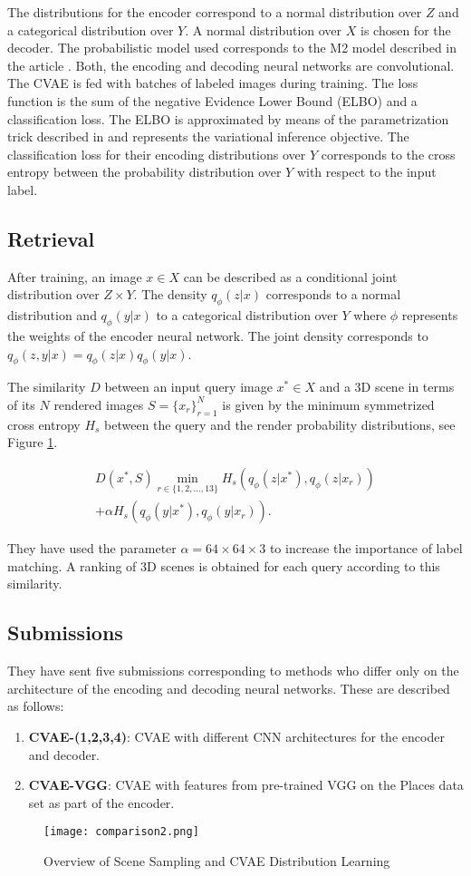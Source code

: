 \documentclass[../main.tex]{subfiles}
\begin{document}
The distributions for the encoder correspond to a normal distribution over $Z$ and a categorical distribution over $Y$. A normal distribution over $X$ is chosen for the decoder. The probabilistic model used corresponds to the M2 model described in the article \cite{Kingma2014a}. Both, the encoding and decoding neural networks are convolutional.\\

The CVAE is fed with batches of labeled images during training. The loss function is the sum of the negative Evidence Lower Bound (ELBO) and a classification loss. The ELBO is approximated by means of the parametrization trick described in \cite{Kingma2014a, kingma2013auto} and represents the variational inference objective. The classification loss for their encoding distributions over $Y$ corresponds to the cross entropy between the probability distribution over $Y$ with respect to the input label. 

\subsection{Retrieval}
After training, an image $x\in X$ can be described as a conditional joint distribution over $Z\times Y$. The density $q_\phi(z|x)$ corresponds to a normal distribution and $q_\phi(y|x)$ to a categorical distribution over $Y$ where $\phi$ represents the weights of the encoder neural network. The joint density corresponds to $q_\phi(z,y|x) = q_\phi(z|x) q_\phi(y|x)$.

The similarity $D$ between an input query image $x^*\in X$ and a 3D scene in terms of its $N$ rendered images $S = \{x_r\}_{r=1}^{N}$ is given by the minimum symmetrized cross entropy $H_s$ between the query and the render probability distributions, see Figure \ref{fig:cvae}.

\begin{multline}
 D(x^*, S)\min_{r\in\{1,2,\ldots,13\} }H_s(q_\phi(z|x^*),q_\phi(z|x_{r}))\\
+\alpha H_s(q_\phi(y|x^*),q_\phi(y|x_{r})).
\end{multline}

They have used the parameter $\alpha = 64\times 64 \times 3$ to increase the importance of label matching. A ranking of 3D scenes is obtained for each query according to this similarity.

\subsection{Submissions}
They have sent five submissions corresponding to methods who differ only on the architecture of the encoding and decoding neural networks. These are described as follows:
\begin{enumerate}
    \item \textbf{CVAE-(1,2,3,4)}: CVAE with different CNN architectures for the encoder and decoder.
    \item \textbf{CVAE-VGG}: CVAE with features from pre-trained VGG \cite{gkallia2017keras_places365} on the Places data set \cite{Places88} as part of the encoder.
    
\end{enumerate}

\begin{figure}[htb]
  \centering
  \texttt{[image: comparison2.png]}
  \caption{\label{fig:cvae} Overview of Scene Sampling and CVAE Distribution Learning}
\end{figure}
\end{document}
